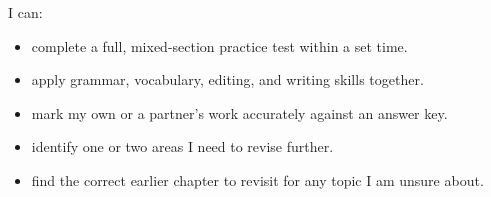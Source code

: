 \begin{selfcheck}
I can:
\begin{itemize}
    \item complete a full, mixed-section practice test within a set time.
    \item apply grammar, vocabulary, editing, and writing skills together.
    \item mark my own or a partner's work accurately against an answer key.
    \item identify one or two areas I need to revise further.
    \item find the correct earlier chapter to revisit for any topic I am unsure about.
\end{itemize}
\end{selfcheck}